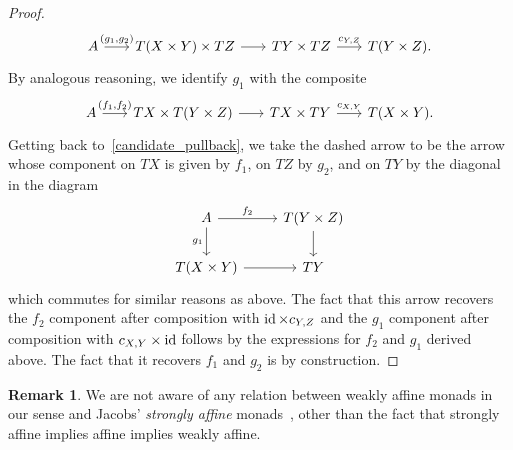 \documentclass[a4paper,UKenglish,numberwithinsect,cleveref, autoref, thm-restate]{lipics-v2021}
\theoremstyle{plain} %
\theoremstyle{definition} %
\newtheorem{myremark}[mytheorem]{Remark}
\begin{document}
\begin{proof}
	\[
		\begin{tikzcd}[column sep=scriptsize]
			A \ar{r}{(g_1, g_2)}	& T(X \times Y) \times TZ \ar{r}	& TY \times TZ \ar{r}{c_{Y,Z}}	& T(Y \times Z).			
		\end{tikzcd}
	\]
	By analogous reasoning, we identify $g_1$ with the composite
	\[
		\begin{tikzcd}[column sep=scriptsize]
			A \ar{r}{(f_1, f_2)}	& TX \times T(Y \times Z) \ar{r}	& TX \times TY \ar{r}{c_{X,Y}}	& T(X \times Y).			
		\end{tikzcd}
	\]
	Getting back to~\eqref{candidate_pullback}, we take the dashed arrow to be the arrow whose component on $TX$ is given by $f_1$, on $TZ$ by $g_2$, and on $TY$ by the diagonal in the diagram
	\[
		\begin{tikzcd}
			A \ar{r}{f_2} \ar[swap]{d}{g_1}	& T(Y \times Z)	\ar{d}	\\
			T(X \times Y) \ar{r}		& TY
		\end{tikzcd}
	\]
	which commutes for similar reasons as above.
	The fact that this arrow recovers the $f_2$ component after composition with $\operatorname{ id} \times c_{Y,Z}$ and the $g_1$ component after composition with $c_{X,Y} \times \operatorname{ id}$ follows by the expressions for $f_2$ and $g_1$ derived above.
	The fact that it recovers $f_1$ and $g_2$ is by construction.

\end{proof}

\begin{myremark}
	We are not aware of any relation between weakly affine monads in our sense and Jacobs' \emph{strongly affine} monads~\cite{Jacobs16}, other than the fact that strongly affine implies affine implies weakly affine.
\end{myremark}
\end{document}
